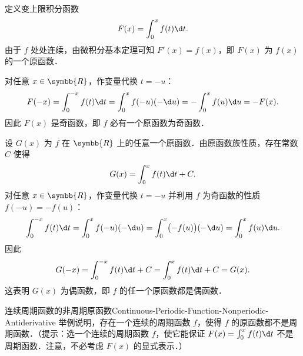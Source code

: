 \begin{myproof}

    定义变上限积分函数
    \begin{equation}
        F(x) = \int_0^x f(t) \d t.
    \end{equation}
    由于 $f$ 处处连续，由微积分基本定理可知 $F'(x) = f(x)$，即 $F(x)$ 为 $f(x)$ 的一个原函数．

    对任意 $x \in \symbb{R}$，作变量代换 $t = -u$：
    \begin{equation}
        F(-x) = \int_0^{-x} f(t) \d t = \int_0^x f(-u)(-\d u) = -\int_0^x f(u) \d u = -F(x).
    \end{equation}
    因此 $F(x)$ 是奇函数，即 $f$ 必有一个原函数为奇函数．


    设 $G(x)$ 为 $f$ 在 $\symbb{R}$ 上的任意一个原函数．由原函数族性质，存在常数 $C$ 使得
    \begin{equation}
        G(x) = \int_0^x f(t) \d t + C.
    \end{equation}
    对任意 $x \in \symbb{R}$，作变量代换 $t = -u$ 并利用 $f$ 为奇函数的性质 $f(-u) = -f(u)$：
    \begin{equation}
        \int_0^{-x} f(t) \d t = \int_0^x f(-u)(-\d u) = \int_0^x \bigl(-f(u)\bigr)(-\d u) = \int_0^x f(u) \d u.
    \end{equation}
    因此
    \begin{equation}
        G(-x) = \int_0^{-x} f(t) \d t + C = \int_0^x f(t) \d t + C = G(x).
    \end{equation}
    这表明 $G(x)$ 为偶函数，即 $f$ 的任一个原函数都是偶函数．
\end{myproof}

\begin{problem}{连续周期函数的非周期原函数}{Continuous-Periodic-Function-Nonperiodic-Antiderivative}
    举例说明，存在一个连续的周期函数 $f$，使得 $f$ 的原函数都不是周期函数．（提示：选一个连续的周期函数 $f$，使它能保证 $F(x) = \int_0^x f(t) \d t$ 不是周期函数．注意，不必考虑 $F(x)$ 的显式表示．）
\end{problem}

